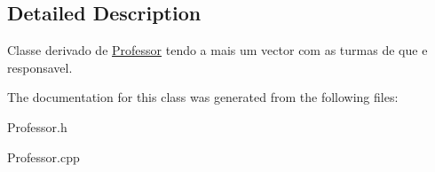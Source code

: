 \subsection{Detailed Description}
Classe derivado de \hyperlink{class_professor}{Professor} tendo a mais um vector com as turmas de que e responsavel. 

The documentation for this class was generated from the following files\-:\begin{DoxyCompactItemize}
\item 
Professor.\-h\item 
Professor.\-cpp\end{DoxyCompactItemize}
